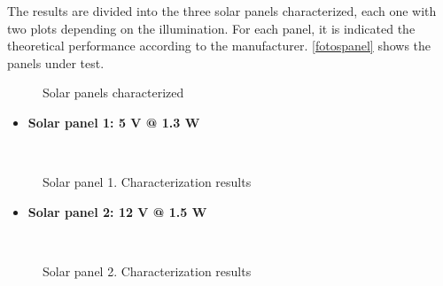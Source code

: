 The results are divided into the three solar panels characterized, each one with two plots depending on the illumination. For each panel, it is indicated the theoretical performance according to the manufacturer. \autoref{fotospanel} shows the panels under test.
\begin{landscape}


\vspace*{\fill}
\begin{figure}[H]
			\centering
			\quad
			\quad
			\caption{Solar panels characterized} \label{fotospanel}
\end{figure}
\vspace*{\fill}


\end{landscape}


\begin{itemize} [noitemsep,topsep=0pt]
\item \textbf{Solar panel 1: 5 V @ 1.3 W}
\end{itemize}


\begin{figure}[H]
			\centering
			\\
			\caption{Solar panel 1. Characterization results} %
			\vspace{-2cm}
\end{figure}

\newpage


\begin{itemize} [noitemsep,topsep=0pt]
\item \textbf{Solar panel 2: 12 V @ 1.5 W}
\end{itemize}

\begin{figure}[H]
			\centering
			\\
			\caption{Solar panel 2. Characterization results} %
			\vspace{-2cm}
\end{figure}



